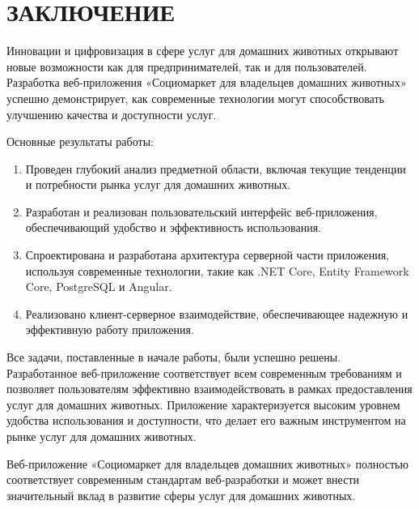 \section*{ЗАКЛЮЧЕНИЕ}

Инновации и цифровизация в сфере услуг для домашних животных открывают новые возможности как для предпринимателей, так и для пользователей. Разработка веб-приложения «Социомаркет для владельцев домашних животных» успешно демонстрирует, как современные технологии могут способствовать улучшению качества и доступности услуг.

Основные результаты работы:

\begin{enumerate}
\item Проведен глубокий анализ предметной области, включая текущие тенденции и потребности рынка услуг для домашних животных.
\item Разработан и реализован пользовательский интерфейс веб-приложения, обеспечивающий удобство и эффективность использования.
\item Спроектирована и разработана архитектура серверной части приложения, используя современные технологии, такие как .NET Core, Entity Framework Core, PostgreSQL и Angular.
\item Реализовано клиент-серверное взаимодействие, обеспечивающее надежную и эффективную работу приложения.
\end{enumerate}

Все задачи, поставленные в начале работы, были успешно решены. Разработанное веб-приложение соответствует всем современным требованиям и позволяет пользователям эффективно взаимодействовать в рамках предоставления услуг для домашних животных. Приложение характеризуется высоким уровнем удобства использования и доступности, что делает его важным инструментом на рынке услуг для домашних животных.

Веб-приложение «Социомаркет для владельцев домашних животных» полностью соответствует современным стандартам веб-разработки и может внести значительный вклад в развитие сферы услуг для домашних животных.
